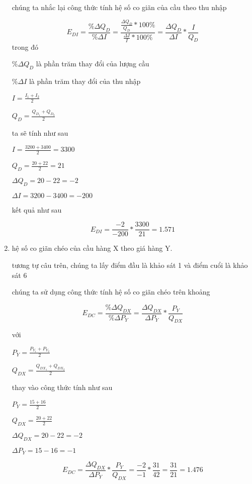 \begin{enumerate}
        chúng ta nhắc lại công thức tính hệ số co giãn của cầu theo thu nhập

        \[ E_{DI} =
          \frac{\% \Delta Q_D}{\% \Delta I}
          = \frac{\frac{\Delta Q_D}{Q_D} * 100 \% }{\frac{\Delta I}{I} * 100 \% }
          = \frac{\Delta Q_D}{\Delta I} * \frac{I}{Q_D}
        \]
        trong đó

        $\% \Delta Q_D$ là phần trăm thay đổi của lượng cầu

        $\% \Delta I$ là phần trăm thay đổi của thu nhập

        $ I = \frac{I_1 + I_2}{2}$

        $ Q_D = \frac{Q_{D_1} + Q_{D_2}}{2}$


        ta sẽ tính như sau

        $ I = \frac{3200 + 3400}{2} = 3300$

        $ Q_D = \frac{20 + 22}{2} = 21$

        $\Delta Q_D = 20 - 22 = -2$

        $\Delta I = 3200 - 3400 = -200$

        kết quả như sau

        \[ E_{DI} = \frac{-2}{-200} * \frac{3300}{21} =  1.571 \]


  \item hệ số co giãn chéo của cầu hàng X theo giá hàng Y.

        tương tự câu trên, chúng ta lấy điểm đầu là khảo sát 1 và điểm cuổi là khảo sát 6

        chúng ta sử dụng công thức tính hệ số co giãn chéo trên khoảng

        \[ E_{DC} = \frac{\% \Delta Q_{DX}}{\% \Delta P_{Y}}
          =  \frac{ \Delta Q_{DX}}{\Delta P_{Y}} * \frac{P_{Y}}{Q_{DX}} \]

        với

        $P_{Y} = \frac{P_{Y_1} + P_{Y_2}}{2}$

        $Q_{DX} = \frac{Q_{DX_1} + Q_{DX_2}}{2}$

        thay vào công thức tính như sau

        $P_{Y} = \frac{15 + 16 }{2}$

        $Q_{DX} = \frac{20 + 22}{2}$

        $\Delta Q_{DX} = 20 -22 = -2$

        $\Delta P_{Y} = 15 - 16 = -1$

        \[ E_{DC} = \frac{ \Delta Q_{DX}}{\Delta P_{Y}} * \frac{P_{Y}}{Q_{DX}}
          = \frac{-2}{-1} * \frac{31}{42} = \frac{31}{21} =  1.476 \]



\end{enumerate}
